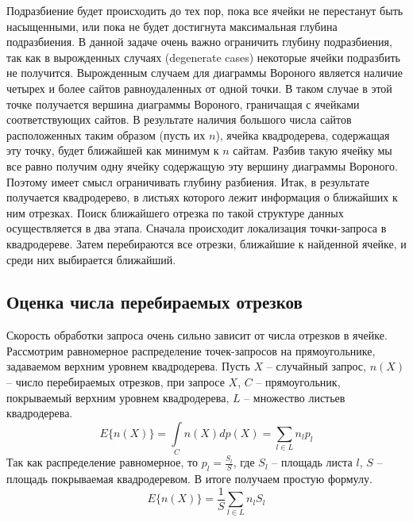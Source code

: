 
Подразбиение будет происходить до тех пор, пока все ячейки не
перестанут быть насыщенными, или пока не будет достигнута максимальная
глубина подразбиения. В данной задаче очень важно ограничить глубину
подразбиения, так как в вырожденных случаях (degenerate cases) некоторые
ячейки подразбить не получится. Вырожденным случаем для диаграммы
Вороного является наличие четырех и более сайтов равноудаленных от одной
точки. В таком случае в этой точке получается вершина диаграммы Вороного,
граничащая с ячейками соответствующих сайтов. В результате наличия
большого числа сайтов расположенных таким образом (пусть их $n$), ячейка
квадродерева, содержащая эту точку, будет ближайшей как минимум к $n$
сайтам. Разбив такую ячейку мы все равно получим одну ячейку содержащую
эту вершину диаграммы Вороного. Поэтому имеет смысл ограничивать
глубину разбиения.
Итак, в результате получается квадродерево, в листьях которого лежит
информация о ближайших к ним отрезках. Поиск ближайшего отрезка по такой
структуре данных осуществляется в два этапа. Сначала происходит
локализация точки-запроса в квадродереве. Затем перебираются все отрезки,
ближайшие к найденной ячейке, и среди них выбирается ближайший.

\FloatBarrier
\subsection{Оценка числа перебираемых отрезков}
Скорость обработки запроса очень сильно зависит от числа отрезков в ячейке.
Рассмотрим равномерное распределение точек-запросов на прямоугольнике,
задаваемом верхним уровнем квадродерева. Пусть $X$ -- случайный запрос, 
$n(X)$ -- число перебираемых отрезков, при запросе $X$, $C$ -- прямоугольник, 
покрываемый верхним уровнем квадродерева, $L$ -- множество листьев квадродерева.
\begin{equation}
E\{n(X)\} = \int\limits_Cn(X)dp(X) =  \sum\limits_{l \in L}n_lp_l
\end{equation}
Так как распределение равномерное, то $p_l = \frac{S_l}{S}$, где 
$S_l$ -- площадь листа $l$, $S$ -- площадь покрываемая квадродеревом.
В итоге получаем простую формулу.
\begin{equation}
E\{n(X)\} = \frac{1}{S}\sum\limits_{l \in L}n_lS_l
\end{equation}

